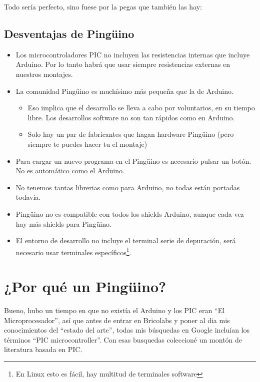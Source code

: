 \documentclass[12pt,a4paper,twoside,DIV=15]{scrartcl}
\begin{document}
Todo sería perfecto, sino fuese por la pegas que también las hay:

\subsection{Desventajas de Pingüino}
\label{sec:desventajas}

\begin{itemize}
\item Los microcontroladores PIC no incluyen las resistencias internas
  que incluye Arduino. Por lo tanto habrá que usar siempre
  resistencias externas en nuestros montajes.
\item La comunidad Pingüino es muchísimo más pequeña que la de Arduino.
  \begin{itemize}
  \item Eso implica que el desarrollo se lleva a cabo por voluntarios,
    en su tiempo libre. Los desarrollos software no son tan rápidos
    como en Arduino.
  \item Solo hay un par de fabricantes que hagan hardware Pingüino
    (pero siempre te puedes hacer tu el montaje)
  \end{itemize}
\item Para cargar un nuevo programa en el Pingüino es necesario pulsar
  un botón. No es automático como el Arduino.
\item No tenemos tantas librerias como para Arduino, no todas están
  portadas todavía.
\item Pingüino no es compatible con todos los shields Arduino, aunque
  cada vez hay más shields para Pingüino.
\item El entorno de desarrollo no incluye el terminal serie de
  depuración, será necesario usar terminales específicos\footnote{En
    Linux esto es fácil, hay multitud de terminales software}.
\end{itemize}

\section{¿Por qué un Pingüino?}
\label{sec:porque}

Bueno, hubo un tiempo en que no existía el Arduino y los PIC eran ``El
Microprocesador'', así que antes de entrar en Bricolabs y poner al dia
mis conocimientos del ``estado del arte'', todas mis búsquedas en
Google incluían los términos ``PIC microcontroller''. Con esas
busquedas coleccioné un montón de literatura basada en PIC.
\end{document}
